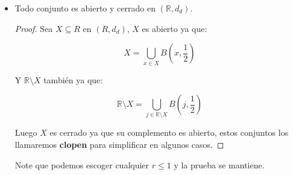 \begin{itemize}[leftmargin=*]
\begin{tikznt}
\end{tikznt}

\begin{proof}
    Para ver que los naturales son cerrados con $d_1$, veamos que su complemento es abierto. Observe que:

    $$\displaystyle \mathbb{R}\setminus\mathbb{N}=(-\infty,0)\bigcup_{i \in \mathbb{N}}B\left(i+\frac{1}{2},\frac{1}{2}\right)$$

Note que esas bolas son abiertas y unión arbitraria de abiertos es abierto, efectivamente esas bolas cubren $\mathbb{R}\setminus \mathbb{N}$ entonces acabamos.
    
\end{proof}


\item Todo conjunto es abierto y cerrado en $\left(\mathbb{R}, d_d\right)$.\\

\begin{proof}
    Sea $X\subseteq R$ en $(R,d_d)$, $X$ es abierto ya que:

    $$X=\bigcup_{x \in X}B\left(x,\frac{1}{2}\right)$$

    Y $\mathbb{R}\setminus X$ también ya que:

     $$\mathbb{R}\setminus X=\bigcup_{j \in \mathbb{R}\setminus X}B\left(j,\frac{1}{2}\right)$$

     Luego $X$ es cerrado ya que su complemento es abierto, estos conjuntos los llamaremos \textbf{clopen} para simplificar en algunos casos.
\end{proof}

Note que podemos escoger cualquier $r\leq 1$ y la prueba se mantiene.


\end{itemize}
